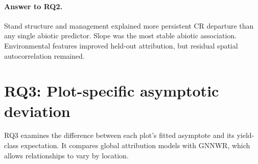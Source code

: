

\paragraph*{Answer to RQ2.}
Stand structure and management explained more persistent CR departure than any single abiotic
predictor. Slope was the most stable abiotic association. Environmental features improved held-out
attribution, but residual spatial autocorrelation remained.


\section{RQ3: Plot-specific asymptotic deviation}
\label{sec:results-rq3}

RQ3 examines the difference between each plot's fitted asymptote and its yield-class expectation.
It compares global attribution models with GNNWR, which allows relationships to vary by location.

